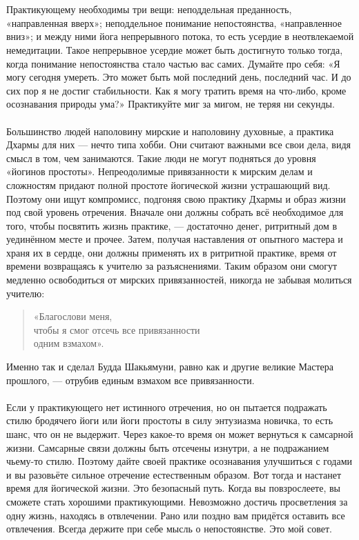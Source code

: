 \\ \\ Практикующему необходимы три вещи: неподдельная преданность, «направленная вверх»; неподдельное понимание непостоянства, «направленное вниз»; и между ними йога непрерывного потока, то есть усердие в неотвлекаемой немедитации. Такое непрерывное усердие может быть достигнуто только тогда, когда понимание непостоянства стало частью вас самих. Думайте про себя: «Я могу сегодня умереть. Это может быть мой последний день, последний час. И до сих пор я не достиг стабильности. Как я могу тратить время на что-либо, кроме осознавания природы ума?» Практикуйте миг за мигом, не теряя ни секунды.
\\ \\ Большинство людей наполовину мирские и наполовину духовные, а практика Дхармы для них — нечто типа хобби. Они считают важными все свои дела, видя смысл в том, чем занимаются. Такие люди не могут подняться до уровня «йогинов простоты». Непреодолимые привязанности к мирским делам и сложностям придают полной простоте йогической жизни устрашающий вид. Поэтому они ищут компромисс, подгоняя свою практику Дхармы и образ жизни под свой уровень отречения. Вначале они должны собрать всё необходимое для того, чтобы посвятить жизнь практике, — достаточно денег, ритритный дом в уединённом месте и прочее. Затем, получая наставления от опытного мастера и храня их в сердце, они должны применять их в ритритной практике, время от времени возвращаясь к учителю за разъяснениями. Таким образом они смогут медленно освободиться от мирских привязанностей, никогда не забывая молиться учителю:
\begin{verse}
«Благослови меня,
  \\ \indent чтобы я смог отсечь все привязанности 
        \\ \indent \indent одним взмахом».
\end{verse}
\newpage
Именно так и сделал Будда Шакьямуни, равно как и другие великие Мастера прошлого, — отрубив единым взмахом все привязанности.
\\ \\ Если у практикующего нет истинного отречения, но он пытается подражать стилю бродячего йоги или йоги простоты в силу энтузиазма новичка, то есть шанс, что он не выдержит. Через какое-то время он может вернуться к самсарной жизни. Самсарные связи должны быть отсечены изнутри, а не подражанием чьему-то стилю. Поэтому дайте своей практике осознавания улучшиться с годами и вы разовьёте сильное отречение естественным образом. Вот тогда и настанет время для йогической жизни. Это безопасный путь. Когда вы повзрослеете, вы сможете стать хорошими практикующими. Невозможно достичь просветления за одну жизнь, находясь в отвлечении. Рано или поздно вам придётся оставить все отвлечения. Всегда держите при себе мысль о непостоянстве. Это мой совет.
